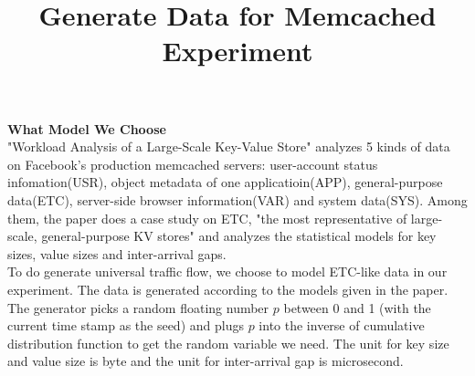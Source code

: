 \documentclass[11pt]{article}
\title{Generate Data for Memcached Experiment}
\author{\Name}
\begin{document}
\maketitle

{\bf What Model We Choose}\\
"Workload Analysis of a Large-Scale Key-Value Store" analyzes 5 kinds of data on Facebook's production memcached servers: user-account status infomation(USR), object metadata of one applicatioin(APP), general-purpose data(ETC), server-side browser information(VAR) and system data(SYS). Among them, the paper does a case study on ETC, "the most representative of large-scale, general-purpose KV stores" and analyzes the statistical models for key sizes, value sizes and inter-arrival gaps. \\
To do generate universal traffic flow, we choose to model ETC-like data in our experiment. The data is generated according to the models given in the paper. The generator picks a random floating number $p$ between 0 and 1 (with the current time stamp as the seed) and plugs $p$ into the inverse of cumulative distribution function to get the random variable we need.
The unit for key size and value size is byte and the unit for inter-arrival gap is microsecond. \\
\end{document}
